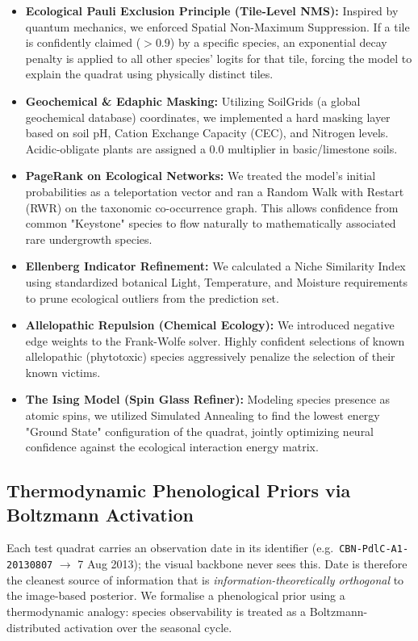 \documentclass[10pt,twocolumn,letterpaper]{article}
\begin{document}
\begin{itemize}
    \item \textbf{Ecological Pauli Exclusion Principle (Tile-Level NMS):} Inspired by quantum mechanics, we enforced Spatial Non-Maximum Suppression. If a tile is confidently claimed ($>0.9$) by a specific species, an exponential decay penalty is applied to all other species' logits for that tile, forcing the model to explain the quadrat using physically distinct tiles.
    \item \textbf{Geochemical \& Edaphic Masking:} Utilizing SoilGrids (a global geochemical database) coordinates, we implemented a hard masking layer based on soil pH, Cation Exchange Capacity (CEC), and Nitrogen levels. Acidic-obligate plants are assigned a $0.0$ multiplier in basic/limestone soils.
    \item \textbf{PageRank on Ecological Networks:} We treated the model's initial probabilities as a teleportation vector and ran a Random Walk with Restart (RWR) on the taxonomic co-occurrence graph. This allows confidence from common "Keystone" species to flow naturally to mathematically associated rare undergrowth species.
    \item \textbf{Ellenberg Indicator Refinement:} We calculated a Niche Similarity Index using standardized botanical Light, Temperature, and Moisture requirements to prune ecological outliers from the prediction set.
    \item \textbf{Allelopathic Repulsion (Chemical Ecology):} We introduced negative edge weights to the Frank-Wolfe solver. Highly confident selections of known allelopathic (phytotoxic) species aggressively penalize the selection of their known victims.
    \item \textbf{The Ising Model (Spin Glass Refiner):} Modeling species presence as atomic spins, we utilized Simulated Annealing to find the lowest energy "Ground State" configuration of the quadrat, jointly optimizing neural confidence against the ecological interaction energy matrix.
\end{itemize}

\subsection{Thermodynamic Phenological Priors via Boltzmann Activation}
\label{sec:phenology}
Each test quadrat carries an observation date in its identifier (e.g.\ \texttt{CBN-PdlC-A1-20130807} $\to$ 7 Aug 2013); the visual backbone never sees this. Date is therefore the cleanest source of information that is \emph{information-theoretically orthogonal} to the image-based posterior. We formalise a phenological prior using a thermodynamic analogy: species observability is treated as a Boltzmann-distributed activation over the seasonal cycle.
\end{document}
